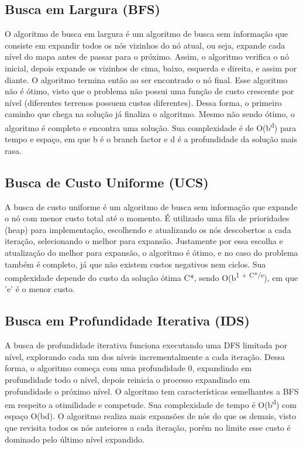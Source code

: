 \documentclass[10pt]{extarticle} %
\begin{document}
\subsection{Busca em Largura (BFS)}

O algoritmo de busca em largura é um algoritmo de busca sem informação que consiste em expandir todos os nós vizinhos do nó atual, ou seja, expande cada nível do mapa antes de passar para o próximo. Assim, o algoritmo verifica o nó inicial, depois expande os vizinhos de cima, baixo, esquerda e direita, e assim por diante. O algoritmo termina então ao ser encontrado o nó final. Esse algoritmo não é ótimo, visto que o problema não possui uma função de custo crescente por nível (diferentes terrenos possuem custos diferentes). Dessa forma, o primeiro caminho que chega na solução já finaliza o algoritmo. Mesmo não sendo ótimo, o algoritmo é completo e encontra uma solução. Sua complexidade é de O(b\textsuperscript{d}) para tempo e espaço, em que b é o branch factor e d é a profundidade da solução mais rasa.

\subsection{Busca de Custo Uniforme (UCS)}

A busca de custo uniforme é um algoritmo de busca sem informação que expande o nó com menor custo total até o momento. É utilizado uma fila de prioridades (heap) para implementação, escolhendo e atualizando os nós descobertos a cada iteração, selecionando o melhor para expansão. Justamente por essa escolha e atualização do melhor para expansão, o algoritmo é ótimo, e no caso do problema também é completo, já que não existem custos negativos nem ciclos. Sua complexidade depende do custo da solução ótima C*, sendo O(b\textsuperscript{1 + C*/e}), em que 'e' é o menor custo.

\subsection{Busca em Profundidade Iterativa (IDS)}

A busca de profundidade iterativa funciona executando uma DFS limitada por nível, explorando cada um dos níveis incrementalmente a cada iteração. Dessa forma, o algoritmo começa com uma profundidade 0, expandindo em profundidade todo o nível, depois reinicia o processo expandindo em profundidade o próximo nível. O algoritmo tem características semelhantes a BFS em respeito a otimilidade e competude. Sua complexidade de tempo é O(b\textsuperscript{d}) com espaço O(bd). O algoritmo realiza mais expansões de nós do que os demais, visto que revisita todos os nós anteiores a cada iteração, porém no limite esse custo é dominado pelo último nível expandido.
\end{document}
